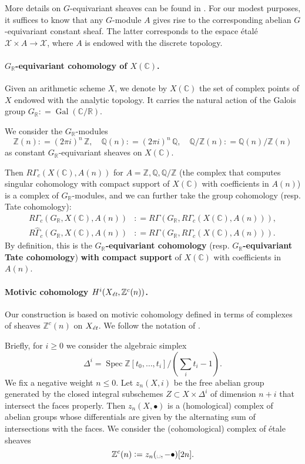 \documentclass[leqno,12pt]{article}
\theoremstyle{plain}
\theoremstyle{definition}
\DeclareMathOperator{\Spec}{Spec}
\DeclareMathOperator{\Gal}{Gal}
\newcommand{\CC}{\mathbb{C}}
\newcommand{\QQ}{\mathbb{Q}}
\newcommand{\RR}{\mathbb{R}}
\newcommand{\ZZ}{\mathbb{Z}}
\newcommand{\dfn}{\mathrel{\mathop:}=}
\newcommand{\et}{\text{\it \'{e}t}}
\begin{document}
More details on $G$-equivariant sheaves can be found in
\cite[Chapitre~2]{Morin-these}. For our modest purposes, it suffices to know
that any $G$-module $A$ gives rise to the corresponding abelian $G$-equivariant
constant sheaf. The latter corresponds to the espace \'{e}tal\'{e}
$\mathcal{X}\times A \to \mathcal{X}$, where $A$ is endowed with the discrete
topology.

\paragraph{$G_\RR$-equivariant cohomology of $X (\CC)$.}
Given an arithmetic scheme $X$, we denote by $X (\CC)$ the set of complex points
of $X$ endowed with the analytic topology. It carries the natural action of the
Galois group $G_\RR \dfn \Gal (\CC/\RR)$.

We consider the $G_\RR$-modules
\[ \ZZ (n) \dfn (2\pi i)^n\,\ZZ, \quad
  \QQ (n) \dfn (2\pi i)^n\,\QQ, \quad
  \QQ/\ZZ (n) \dfn \QQ (n) / \ZZ (n) \]
as constant $G_\RR$-equivariant sheaves on $X (\CC)$.

Then $R\Gamma_c (X (\CC), A (n))$ for $A = \ZZ, \QQ, \QQ/\ZZ$ (the complex that
computes singular cohomology with compact support of $X (\CC)$ with
coefficients in $A (n)$) is a complex of $G_\RR$-modules, and we can further
take the group cohomology (resp. Tate cohomology):
\begin{align*}
  R\Gamma_c (G_\RR, X (\CC), A (n)) & \dfn R\Gamma (G_\RR, R\Gamma_c (X (\CC), A (n))),\\
  R\widehat{\Gamma}_c (G_\RR, X (\CC), A (n)) & \dfn R\widehat{\Gamma} (G_\RR, R\Gamma_c (X (\CC), A (n))).
\end{align*}
By definition, this is the \textbf{$G_\RR$-equivariant cohomology}
(resp. \textbf{$G_\RR$-equivariant Tate cohomology})
\textbf{with compact support} of $X (\CC)$ with coefficients in $A (n)$.

\paragraph{Motivic cohomology $H^i (X_\et, \ZZ^c (n))$.}
Our construction is based on motivic cohomology defined in terms of complexes
of sheaves $\ZZ^c (n)$ on $X_\et$. We follow the notation of
\cite{Geisser-2010}.

Briefly, for $i \ge 0$ we consider the algebraic simplex
$$\Delta^i = \Spec \ZZ[t_0,\ldots,t_i]/(\sum_i t_i - 1).$$
We fix a negative weight $n \le 0$. Let $z_n (X,i)$ be the free abelian group
generated by the closed integral subschemes $Z \subset X \times \Delta^i$ of
dimension $n + i$ that intersect the faces properly. Then $z_n (X, \bullet)$ is
a (homological) complex of abelian groups whose differentials are given by the
alternating sum of intersections with the faces. We consider the (cohomological)
complex of \'{e}tale sheaves
$$\ZZ^c (n) \dfn z_n (\text{\textvisiblespace}, -\bullet) [2n].$$
\end{document}
